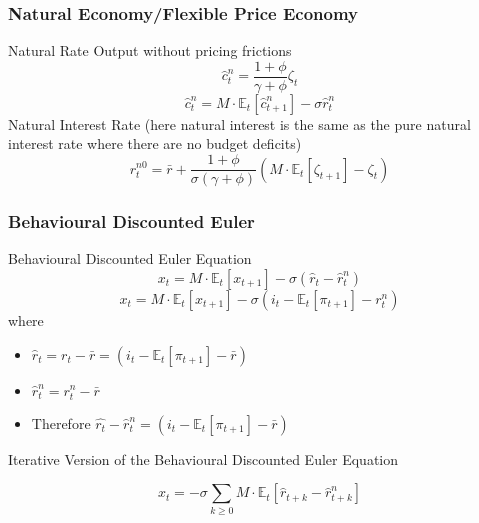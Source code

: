 \documentclass{beamer}
\begin{document}
\subsubsection{Natural Economy/Flexible Price Economy}
\begin{frame}{\subsecname}

Natural Rate Output without pricing frictions
\begin{equation}\tag{21}
    \hat{c}_{t}^{n}=\frac{1+\phi}{\gamma+\phi}\zeta_{t}
\end{equation}
\begin{equation}\tag{22}
    \hat{c}^{n}_{t} = M\cdot\mathbb{E}_{t}\left[\hat{c}^{n}_{t+1}\right]-\sigma\hat{r}^{n}_{t}
\end{equation}
Natural Interest Rate (here natural interest is the same as the pure natural interest rate where there are no budget deficits)
\begin{equation}\tag{23}
    r^{n0}_{t}=\bar{r}+\frac{1+\phi}{\sigma(\gamma+\phi)}\left(M\cdot\mathbb{E}_{t}\left[\zeta_{t+1}\right]-\zeta_{t}\right)
\end{equation}
\end{frame}

\subsubsection{Behavioural Discounted Euler}
\begin{frame}{\subsecname}
Behavioural Discounted Euler Equation
\begin{equation}\tag{24}
    x_{t}=M\cdot\mathbb{E}_{t}\left[x_{t+1}\right]-\sigma(\hat{r}_{t}-\hat{r}^{n}_{t})
\end{equation}
\begin{equation}\tag{25}
    x_{t}=M\cdot\mathbb{E}_{t}\left[x_{t+1}\right]-\sigma(i_{t}-\mathbb{E}_{t}\left[\pi_{t+1}\right]-r^{n}_{t})
\end{equation}
 where
\begin{itemize}
    \item $\hat r_{t}= r_{t}- \bar r = (i_{t}-\mathbb{E}_{t}\left[\pi_{t+1}\right]-\bar{r})$
    \item $\hat r_{t}^{n}= r_{t}^{n}- \bar r$ 
    \item Therefore $\hat{r_{t}}-\hat{r}^{n}_{t}=(i_{t}-\mathbb{E}_{t}\left[\pi_{t+1}\right]-\bar{r})$
\end{itemize}

Iterative Version of the Behavioural Discounted Euler Equation

\begin{equation}\tag{26}
    x_{t}=-\sigma\sum_{k\geq 0}{M\cdot \mathbb{E}_{t}\left[\hat{r}_{t+k}-\hat{r}_{t+k}^{n}\right]}
\end{equation}

\end{frame}
\end{document}
